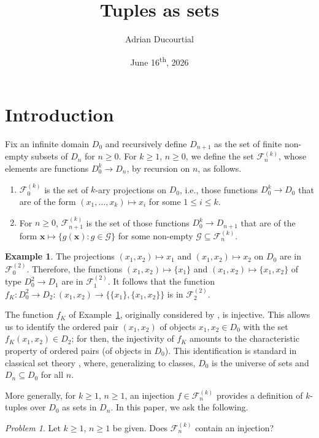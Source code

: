 \documentclass[a4paper,12pt]{article}
\title{Tuples as sets}
\author{Adrian Ducourtial}
\date{June 16\textsuperscript{th}, 2026}
\theoremstyle{definition}
\newtheorem{example}[theorem]{Example}
\theoremstyle{remark}
\newtheorem*{problem}{Problem}
\newcommand{\fset}[2]{\mathcal F^{(#1)}_{#2}}
\begin{document}
\maketitle

\section{Introduction}

Fix an infinite domain $D_0$ and recursively define $D_{n+1}$ as the set of finite non-empty subsets of $D_n$ for $n \geq 0$. For $k \geq 1$, $n \geq 0$, we define the set $\fset kn$, whose elements are functions $D_0^k \to D_n$, by recursion on $n$, as follows.
\begin{enumerate}
    \item $\fset k0$ is the set of $k$-ary projections on $D_0$, i.e., those functions $D_0^k \to D_0$ that are of the form $(x_1, \dots, x_k) \mapsto x_i$ for some $1 \leq i \leq k$.
    \item For $n \geq 0$, $\fset k{n+1}$ is the set of those functions $D_0^k \to D_{n+1}$ that are of the form $\mathbf x \mapsto \{g(\mathbf x) : g \in \mathcal G\}$ for some non-empty $\mathcal G \subseteq \fset kn$.
\end{enumerate}
\begin{example}\label{ex}
    The projections $(x_1, x_2) \mapsto x_1$ and $(x_1, x_2) \mapsto x_2$ on $D_0$ are in $\fset 20$. Therefore, the functions $(x_1, x_2) \mapsto \{x_1\}$ and $(x_1, x_2) \mapsto \{x_1, x_2\}$ of type $D_0^2 \to D_1$ are in $\fset 21$. It follows that the function $f_K : D_0^2 \to D_2 : (x_1, x_2) \to \{\{x_1\}, \{x_1, x_2\}\}$ is in $\fset 22$.
\end{example}
The function $f_K$ of Example~\ref{ex}, originally considered by \textcite[171]{Kur}, is injective. This allows us to identify the ordered pair $(x_1, x_2)$ of objects $x_1, x_2 \in D_0$ with the set $f_K(x_1, x_2) \in D_2$; for then, the injectivity of $f_K$ amounts to the characteristic property of ordered pairs (of objects in $D_0$). This identification is standard in classical set theory \parencite[291]{Kan}, where, generalizing to classes, $D_0$ is the universe of sets and $D_n \subseteq D_0$ for all $n$.

More generally, for $k \geq 1$, $n \geq 1$, an injection $f \in \fset kn$ provides a definition of $k$-tuples over $D_0$ as sets in $D_n$. In this paper, we ask the following.

\begin{problem}
    Let $k \geq 1$, $n \geq 1$ be given. Does $\fset kn$ contain an injection?
\end{problem}
\end{document}
